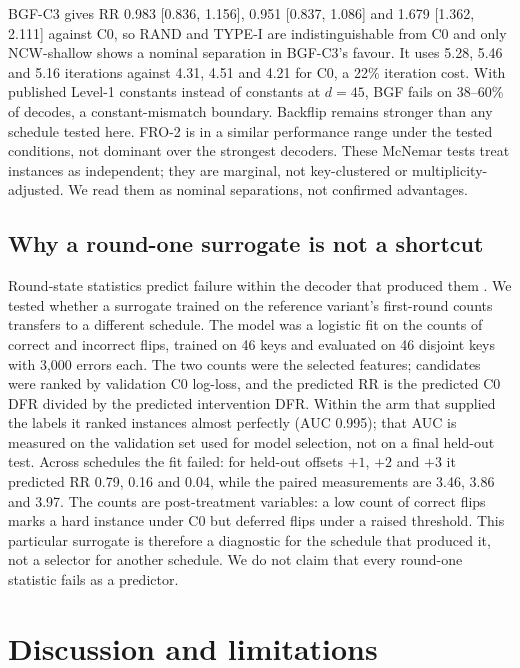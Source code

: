 \documentclass[runningheads,a4paper]{llncs}
\begin{document}
BGF-C3 gives RR 0.983 [0.836, 1.156], 0.951 [0.837, 1.086] and 1.679 [1.362, 2.111] against C0, so RAND and TYPE-I are indistinguishable from C0 and only NCW-shallow shows a nominal separation in BGF-C3's favour. It uses 5.28, 5.46 and 5.16 iterations against 4.31, 4.51 and 4.21 for C0, a 22\% iteration cost. With published Level-1 constants instead of constants at $d=45$, BGF fails on 38--60\% of decodes, a constant-mismatch boundary. Backflip remains stronger than any schedule tested here. FRO-2 is in a similar performance range under the tested conditions, not dominant over the strongest decoders. These McNemar tests treat instances as independent; they are marginal, not key-clustered or multiplicity-adjusted. We read them as nominal separations, not confirmed advantages.


\subsection{Why a round-one surrogate is not a shortcut}\label{sec:counterfactual}

Round-state statistics predict failure within the decoder that produced them \cite{kim2021logistic,paiva2022pickyfix}. We tested whether a surrogate trained on the reference variant's first-round counts transfers to a different schedule. The model was a logistic fit on the counts of correct and incorrect flips, trained on 46 keys and evaluated on 46 disjoint keys with 3,000 errors each. The two counts were the selected features; candidates were ranked by validation C0 log-loss, and the predicted RR is the predicted C0 DFR divided by the predicted intervention DFR. Within the arm that supplied the labels it ranked instances almost perfectly (AUC 0.995); that AUC is measured on the validation set used for model selection, not on a final held-out test. Across schedules the fit failed: for held-out offsets $+1$, $+2$ and $+3$ it predicted RR 0.79, 0.16 and 0.04, while the paired measurements are 3.46, 3.86 and 3.97. The counts are post-treatment variables: a low count of correct flips marks a hard instance under C0 but deferred flips under a raised threshold. This particular surrogate is therefore a diagnostic for the schedule that produced it, not a selector for another schedule. We do not claim that every round-one statistic fails as a predictor.
\section{Discussion and limitations}\label{sec:discussion}
\end{document}
